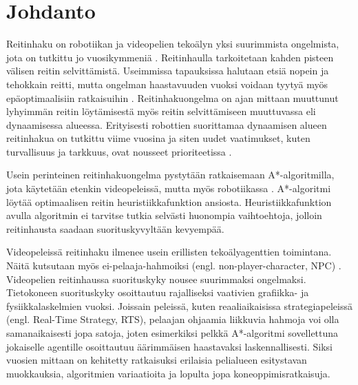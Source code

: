 \documentclass[utf8]{gradu3}
\begin{document}
\bigskip

\mainmatter

\chapter{Johdanto}

Reitinhaku on robotiikan ja videopelien tekoälyn yksi suurimmista ongelmista, jota on tutkittu jo vuosikymmeniä \parencite{abd2015comprehensive,cui2011based}. Reitinhaulla tarkoitetaan kahden pisteen välisen reitin selvittämistä. Useimmissa tapauksissa halutaan etsiä nopein ja tehokkain reitti, mutta ongelman haastavuuden vuoksi voidaan tyytyä myös epäoptimaalisiin ratkaisuihin \parencite{rahmani2022towards}. Reitinhakuongelma on ajan mittaan muuttunut lyhyimmän reitin löytämisestä myös reitin selvittämiseen muuttuvassa eli dynaamisessa alueessa. Erityisesti robottien suorittamaa dynaamisen alueen reitinhakua on tutkittu viime vuosina ja siten uudet vaatimukset, kuten turvallisuus ja tarkkuus, ovat nousseet prioriteetissa \parencite{karur2021survey}.

Usein perinteinen reitinhakuongelma pystytään ratkaisemaan A*-algoritmilla, jota käytetään etenkin videopeleissä, mutta myös robotiikassa \parencite{abd2015comprehensive,botea2013pathfinding,cui2011based}. A*-algoritmi löytää optimaalisen reitin heuristiikkafunktion ansiosta. Heuristiikkafunktion avulla algoritmin ei tarvitse tutkia selvästi huonompia vaihtoehtoja, jolloin reitinhausta saadaan suorituskyvyltään kevyempää.

Videopeleissä reitinhaku ilmenee usein erillisten tekoälyagenttien toimintana. Näitä kutsutaan myös ei-pelaaja-hahmoiksi (engl. non-player-character, NPC) \parencite{cui2011based}. Videopelien reitinhaussa suorituskyky nousee suurimmaksi ongelmaksi. Tietokoneen suorituskyky osoittautuu rajalliseksi vaativien grafiikka- ja fysiikkalaskelmien vuoksi. Joissain peleissä, kuten reaaliaikaisissa strategiapeleissä (engl. Real-Time Strategy, RTS), pelaajan ohjaamia liikkuvia hahmoja voi olla samanaikaisesti jopa satoja, joten esimerkiksi pelkkä A*-algoritmi sovellettuna jokaiselle agentille osoittautuu äärimmäisen haastavaksi laskennallisesti. Siksi vuosien mittaan on kehitetty ratkaisuksi erilaisia pelialueen esitystavan muokkauksia, algoritmien variaatioita ja lopulta jopa koneoppimisratkaisuja.
\end{document}
